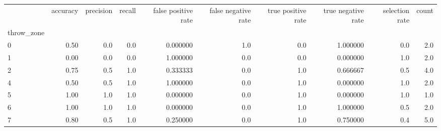 \begin{tabular}{lrrrrrrrrr}
\toprule
{} &  accuracy &  precision &  recall &  false positive rate &  false negative rate &  true positive rate &  true negative rate &  selection rate &  count \\
throw\_zone &           &            &         &                      &                      &                     &                     &                 &        \\
\midrule
0          &      0.50 &        0.0 &     0.0 &             0.000000 &                  1.0 &                 0.0 &            1.000000 &             0.0 &    2.0 \\
1          &      0.00 &        0.0 &     0.0 &             1.000000 &                  0.0 &                 0.0 &            0.000000 &             1.0 &    2.0 \\
2          &      0.75 &        0.5 &     1.0 &             0.333333 &                  0.0 &                 1.0 &            0.666667 &             0.5 &    4.0 \\
4          &      0.50 &        0.5 &     1.0 &             1.000000 &                  0.0 &                 1.0 &            0.000000 &             1.0 &    2.0 \\
5          &      1.00 &        1.0 &     1.0 &             0.000000 &                  0.0 &                 1.0 &            0.000000 &             1.0 &    1.0 \\
6          &      1.00 &        1.0 &     1.0 &             0.000000 &                  0.0 &                 1.0 &            1.000000 &             0.5 &    2.0 \\
7          &      0.80 &        0.5 &     1.0 &             0.250000 &                  0.0 &                 1.0 &            0.750000 &             0.4 &    5.0 \\
\bottomrule
\end{tabular}
